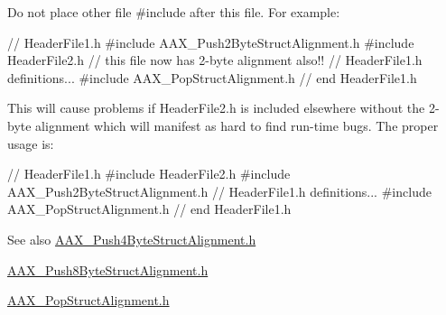 \begin{DoxyItemize}
\item Do not place other file {\ttfamily \#include} after this file. For example\+: 
\begin{DoxyCode}
\textcolor{comment}{// HeaderFile1.h}
\textcolor{preprocessor}{    #include AAX\_Push2ByteStructAlignment.h}
\textcolor{preprocessor}{    #include HeaderFile2.h  // this file now has 2-byte alignment also!!}
    \textcolor{comment}{// HeaderFile1.h definitions...}
\textcolor{preprocessor}{    #include AAX\_PopStructAlignment.h}
\textcolor{preprocessor}{// end HeaderFile1.h}
\end{DoxyCode}
 This will cause problems if Header\+File2.\+h is included elsewhere without the 2-\/byte alignment which will manifest as hard to find run-\/time bugs. The proper usage is\+: 
\begin{DoxyCode}
\textcolor{comment}{// HeaderFile1.h}
\textcolor{preprocessor}{    #include HeaderFile2.h}
\textcolor{preprocessor}{    #include AAX\_Push2ByteStructAlignment.h}
        \textcolor{comment}{// HeaderFile1.h definitions...}
\textcolor{preprocessor}{    #include AAX\_PopStructAlignment.h}
\textcolor{preprocessor}{// end HeaderFile1.h}
\end{DoxyCode}
\end{DoxyItemize}
\begin{DoxySeeAlso}{See also}
\hyperlink{a00285}{A\+A\+X\+\_\+\+Push4\+Byte\+Struct\+Alignment.\+h} 

\hyperlink{a00286}{A\+A\+X\+\_\+\+Push8\+Byte\+Struct\+Alignment.\+h} 

\hyperlink{a00281}{A\+A\+X\+\_\+\+Pop\+Struct\+Alignment.\+h}
\end{DoxySeeAlso}
